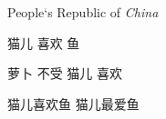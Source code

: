 \documentclass{ctexart}
\newcommand\PRC{People`s Republic of \emph{China}}
\newcommand\loves[2]{#1 喜欢 #2}
\newcommand\hatedby[2]{#2 不受 #1 喜欢}
\newcommand\love[3][喜欢]{#2#1#3}
\begin{document}
	\PRC
	
	\loves{猫儿}{鱼}

	\hatedby{猫儿}{萝卜}

	\love{猫儿}{鱼}
	\love[最爱]{猫儿}{鱼}
\end{document}
